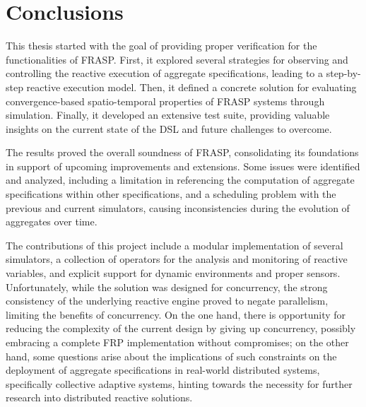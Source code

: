 
\chapter{Conclusions}
\label{chapter:conclusions}

This thesis started with the goal of providing proper verification for the
functionalities of FRASP. First, it explored several strategies for observing
and controlling the reactive execution of aggregate specifications, leading to
a step-by-step reactive execution model. Then, it defined a concrete solution
for evaluating convergence-based spatio-temporal properties of FRASP systems
through simulation. Finally, it developed an extensive test suite, providing
valuable insights on the current state of the \ac{DSL} and future challenges to
overcome.

The results proved the overall soundness of FRASP, consolidating its
foundations in support of upcoming improvements and extensions. Some issues
were identified and analyzed, including a limitation in referencing the
computation of aggregate specifications within other specifications, and a
scheduling problem with the previous and current simulators, causing
inconsistencies during the evolution of aggregates over time.

The contributions of this project include a modular implementation of several
simulators, a collection of operators for the analysis and monitoring of
reactive variables, and explicit support for dynamic environments and proper
sensors. Unfortunately, while the solution was designed for concurrency, the
strong consistency of the underlying reactive engine proved to negate
parallelism, limiting the benefits of concurrency. On the one hand, there is
opportunity for reducing the complexity of the current design by giving up
concurrency, possibly embracing a complete \ac{FRP} implementation without
compromises; on the other hand, some questions arise about the implications of
such constraints on the deployment of aggregate specifications in real-world
distributed systems, specifically collective adaptive systems, hinting towards
the necessity for further research into distributed reactive solutions.
